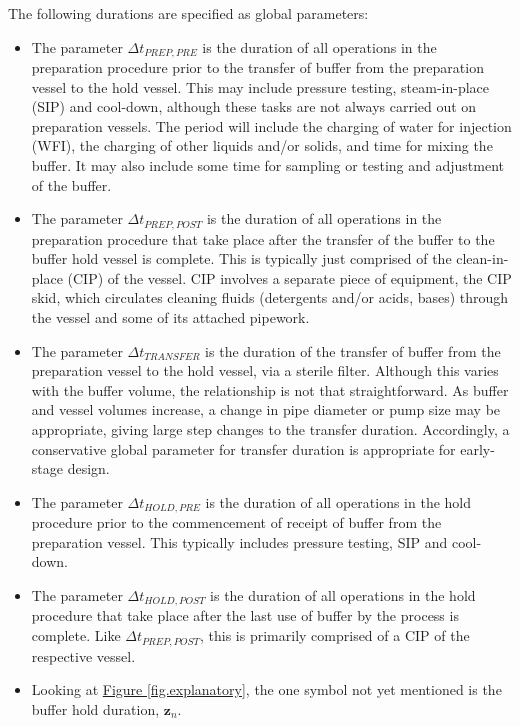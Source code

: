 The following durations are specified as global parameters:

\begin{itemize}
\item
The parameter $\Delta t_{\mathit{PREP,PRE}}$ is the duration of all operations
in the preparation procedure prior to the transfer of buffer from the
preparation vessel to the hold vessel.  
This may include pressure testing, steam-in-place (SIP) and cool-down, although
these tasks are not always carried out on preparation vessels.
The period will include the charging of water for injection (WFI), the charging
of other liquids and/or solids, and time for mixing the buffer.
It may also include some time for sampling or testing and adjustment of the
buffer.
\item
The parameter $\Delta t_{\mathit{PREP,POST}}$ is the duration of all operations
in the preparation procedure that take place after the transfer of the buffer
to the buffer hold vessel is complete.
This is typically just comprised of the clean-in-place (CIP) of the vessel.
CIP involves a separate piece of equipment, the CIP skid, which circulates
cleaning fluids (detergents and/or acids, bases) through the vessel and some of
its attached pipework.
\item
The parameter $\Delta t_{\mathit{TRANSFER}}$ is the duration of the transfer
of buffer from the preparation vessel to the hold vessel, via a sterile filter.
Although this varies with the buffer volume, the relationship is not that
straightforward.
As buffer and vessel volumes increase, a change in pipe diameter or pump size
may be appropriate, giving large step changes to the transfer duration.
Accordingly, a conservative global parameter for transfer duration is
appropriate for early-stage design.
\item
The parameter $\Delta t_{\mathit{HOLD,PRE}}$ is the duration of all operations
in the hold procedure prior to the commencement of receipt of buffer from the
preparation vessel.
This typically includes pressure testing, SIP and cool-down.
\item
The parameter $\Delta t_{\mathit{HOLD,POST}}$ is the duration of all operations
in the hold procedure that take place after the last use of buffer by the
process is complete.
Like $\Delta t_{\mathit{PREP,POST}}$, this is primarily comprised of a CIP of
the respective vessel.
\item
Looking at \hyperref[fig.explanatory]{Figure \ref*{fig.explanatory}}, the one
symbol not yet mentioned is the buffer hold duration, $\boldsymbol{z}_{n}$.

\end{itemize}
